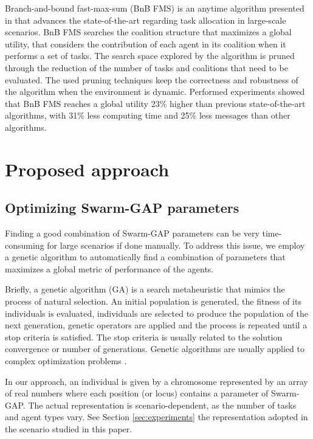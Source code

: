 \documentclass[conference]{IEEEtran}
\begin{document}
Branch-and-bound fast-max-sum (BnB FMS) is an anytime algorithm presented in \cite{Macarthur+2011} that advances the state-of-the-art regarding task allocation in large-scale scenarios. BnB FMS searches the coalition structure that maximizes a global utility, that considers the contribution of each agent in its coalition when it performs a set of tasks. The search space explored by the algorithm is pruned through the reduction of the  number of tasks and coalitions that need to be evaluated. The used pruning techniques keep the correctness and robustness of the algorithm when the environment is dynamic. Performed experiments showed that BnB FMS reaches a global utility 23\% higher than previous state-of-the-art algorithms, with 31\% less computing time and 25\% less messages than other algorithms.


\section{Proposed approach}
\label{sec:approach}

\subsection{Optimizing Swarm-GAP parameters}
\label{sec:opt_swgap}
Finding a good combination of Swarm-GAP parameters can be very time-consuming for large scenarios if done manually. To address this issue, we employ a genetic algorithm to automatically find a combination of parameters that maximizes a global metric of performance of the agents.

Briefly, a genetic algorithm (GA) is a search metaheuristic that mimics the process of natural selection. An initial population is generated, the fitness of its individuals is evaluated, individuals are selected to produce the population of the next generation, genetic operators are applied and the process is repeated until a stop criteria is satisfied. The stop criteria is usually related to the solution convergence or number of generations. Genetic algorithms are usually applied to complex optimization problems \cite{Haupt&Haupt2004}.

In our approach, an individual is given by a chromosome represented by an array of real numbers where each position (or locus) contains a parameter of Swarm-GAP. %
The actual representation is scenario-dependent, as the number of tasks and agent types vary. See Section \ref{sec:experiments} the representation adopted in the scenario studied in this paper.
\end{document}
